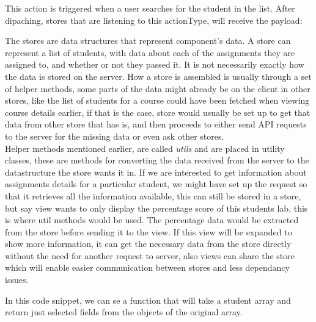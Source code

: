 This action is triggered when a user searches for the student in the list. After dipaching, stores that are listening to this actionType, will receive the payload:



The stores are data structures that represent component's data. A store can represent a list of students, with data about each of the assignments they are assigned to, and whether or not they passed it. It is not necessarily exactly how the data is stored on the server. How a store is assembled is usually through a set of helper methods, some parts of the data might already be on the client in other stores, like the list of students for a course could have been fetched when viewing course details earlier, if that is the case, store would usually be set up to get that data from other store that has is, and then proceeds to either send API requests to the server for the missing data or even ask other stores.
\\Helper methods mentioned earlier, are called \emph{utils} and are placed in utility classes, these are methods for converting the data received from the server to the datastructure the store wants it in. If we are interested to get information about assignments details for a particular student, we might have set up the request so that it retrieves all the information available, this can still be stored in a store, but say view wants to only display the percentage score of this students lab, this is where util methods would be used. The percentage data would be extracted from the store before sending it to the view. If this view will be expanded to show more information, it can get the necessary data from the store directly without the need for another request to server, also views can share the store which will enable easier communication between stores and less dependancy issues.



In this code snippet, we can se a function that will take a student array and return just selected fields from the objects of the original array.

